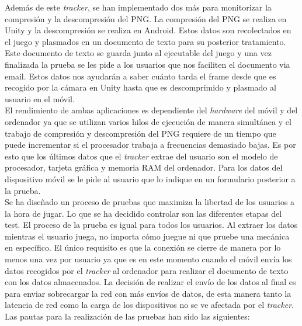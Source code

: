 Adem\'as de este \textit{tracker}, se han implementado dos m\'as para monitorizar la compresi\'on y la descompresi\'on del PNG. La compresi\'on del PNG se realiza en Unity y la descompresi\'on se realiza en Android. Estos datos son recolectados en el juego y plasmados en un documento de texto para su posterior tratamiento. Este documento de texto se guarda junto al ejecutable del juego y una vez finalizada la prueba se les pide a los usuarios que nos faciliten el documento via email. Estos datos nos ayudar\'an a saber cu\'anto tarda el frame desde que es recogido por la c\'amara en Unity hasta que es descomprimido y plasmado al usuario en el m\'ovil. \\

El rendimiento de ambas aplicaciones es dependiente del \textit{hardware} del m\'ovil y del ordenador ya que se utilizan varios hilos de ejecuci\'on de manera simult\'anea y el trabajo de compresi\'on y descompresi\'on del PNG requiere de un tiempo que puede incrementar si el procesador trabaja a frecuencias demasiado bajas. Es por esto que los \'ultimos datos que el \textit{tracker} extrae del usuario son el modelo de procesador, tarjeta gr\'afica y memoria RAM del ordenador. Para los datos del dispositivo m\'ovil se le pide al usuario que lo indique en un formulario posterior a la prueba.\\

Se ha dise\~nado un proceso de pruebas que maximiza la libertad de los usuarios a la hora de jugar. Lo que se ha decidido controlar son las diferentes etapas del test. El proceso de la prueba es igual para todos los usuarios. Al extraer los datos mientras el usuario juega, no importa c\'omo juegue ni que pruebe una mec\'anica en espec\'ifico. El \'unico requisito es que la conexi\'on se cierre de manera por lo menos una vez por usuario ya que es en este momento cuando el m\'ovil env\'ia los datos recogidos por el \textit{tracker} al ordenador para realizar el documento de texto con los datos almacenados. La decisi\'on de realizar el env\'io de los datos al final es para enviar sobrecargar la red con m\'as env\'ios de datos, de esta manera tanto la latencia de red como la carga de los dispositivos no se ve afectada por el \textit{tracker}. Las pautas para la realizaci\'on de las pruebas han sido las siguientes:\\

